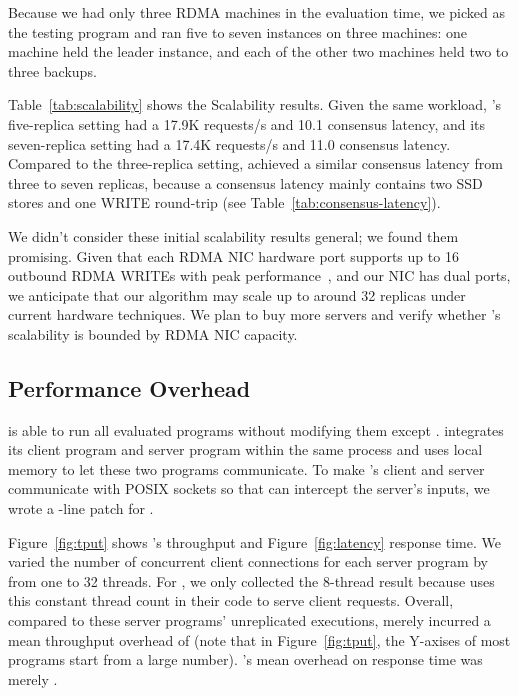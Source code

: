 Because we had only three RDMA machines in the evaluation time, we
picked \redis as the testing program and ran five to seven \xxx instances on
three machines: one machine held the leader instance, and each of the other two
machines held two to three backups.

Table~\ref{tab:scalability} shows the Scalability results. Given the same
workload, \xxx's five-replica setting had a 17.9K requests/s and 10.1
\us consensus latency, and its seven-replica setting had a 17.4K requests/s and
11.0 \us consensus latency. Compared to the three-replica setting, \xxx
achieved a similar consensus latency from three to seven replicas, because a
\xxx consensus latency mainly contains two SSD stores and one WRITE round-trip
(see Table~\ref{tab:consensus-latency}).

We didn't consider these initial scalability results general; we found them
promising. Given that each RDMA NIC hardware port supports up to 16 outbound
RDMA WRITEs with peak performance~\cite{herd:sigcomm14}, and our NIC has dual
ports, we anticipate that our algorithm may scale up to around 32 replicas
under current hardware techniques. We plan to buy more servers and verify
whether \xxx's scalability is bounded by RDMA NIC capacity.


\subsection{Performance Overhead} \label{sec:overhead}


\xxx is able to run all \nprog evaluated programs without modifying them except
\calvin. \calvin integrates its client program and server program within the
same process and uses local memory to let these two programs communicate. To
make \calvin's client and server communicate with POSIX sockets so that \xxx
can intercept the server's inputs, we wrote a \nlinescalvin-line patch for
\calvin.

Figure~\ref{fig:tput} shows \xxx's throughput and Figure~\ref{fig:latency}
response time. We varied the number of concurrent client connections for each
server program by from one to 32 threads. For \calvin, we only collected the
8-thread result because \calvin uses this constant thread count in their code
to serve client requests. Overall, compared to these server programs'
unreplicated executions, \xxx merely incurred a mean throughput overhead of
\tputoverhead (note that in Figure~\ref{fig:tput}, the Y-axises of most programs
start from a large number). \xxx's mean overhead on response time was merely
\latencyoverhead.

